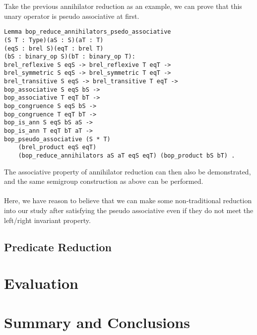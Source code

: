\documentclass[a4paper,12pt,twoside,openright]{report}
\begin{document}
Take the previous annihilator reduction as an example, we can prove that this unary operator is pseudo associative at first.
\begin{lstlisting}
Lemma bop_reduce_annihilators_psedo_associative 
(S T : Type)(aS : S)(aT : T)
(eqS : brel S)(eqT : brel T)
(bS : binary_op S)(bT : binary_op T): 
brel_reflexive S eqS -> brel_reflexive T eqT ->
brel_symmetric S eqS -> brel_symmetric T eqT ->
brel_transitive S eqS -> brel_transitive T eqT -> 
bop_associative S eqS bS ->
bop_associative T eqT bT -> 
bop_congruence S eqS bS ->
bop_congruence T eqT bT -> 
bop_is_ann S eqS bS aS ->
bop_is_ann T eqT bT aT ->
bop_pseudo_associative (S * T) 
	(brel_product eqS eqT) 
	(bop_reduce_annihilators aS aT eqS eqT) (bop_product bS bT) .
\end{lstlisting}

The associative property of annihilator reduction can then also be demonstrated, and the same semigroup construction as above can be performed.\\\\

Here, we have reason to believe that we can make some non-traditional reduction into our study after satisfying the pseudo associative even if they do not meet the left/right invariant property.

\section{Predicate Reduction}
\chapter{Evaluation} 



\chapter{Summary and Conclusions} 

%




\appendix
\singlespacing

 

\end{document}

